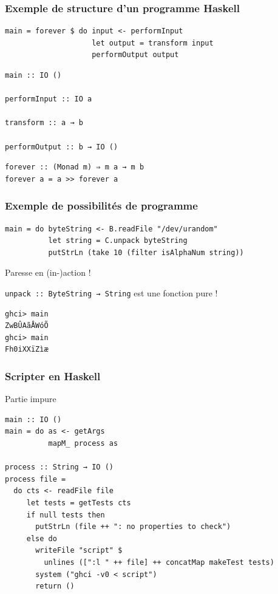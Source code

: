 \documentclass[10pt]{beamer}
\begin{document}
\begin{frame}[fragile]
\frametitle{Exemple de structure d'un programme Haskell}
\begin{verbatim}
main = forever $ do input <- performInput
                    let output = transform input
                    performOutput output
\end{verbatim}

\begin{verbatim}
main :: IO ()

performInput :: IO a

transform :: a → b

performOutput :: b → IO ()
\end{verbatim}

\pause

\begin{verbatim}
forever :: (Monad m) ⇒ m a → m b
forever a = a >> forever a
\end{verbatim}

\end{frame}



\begin{frame}[fragile]
\frametitle{Exemple de possibilités de programme}
\begin{verbatim}
main = do byteString <- B.readFile "/dev/urandom"
          let string = C.unpack byteString
          putStrLn (take 10 (filter isAlphaNum string))
\end{verbatim}

Paresse en (in-)action !

\verb|unpack :: ByteString → String| est une fonction pure !

\begin{verbatim}
ghci> main
ZwBÛAãÅWóÕ
ghci> main
Fh0iXXïZìæ
\end{verbatim}
\end{frame}



\begin{frame}[fragile]
\frametitle{Scripter en Haskell}
\begin{block}{Partie impure}
\begin{verbatim}
main :: IO ()
main = do as <- getArgs
          mapM_ process as

process :: String → IO ()
process file =
  do cts <- readFile file
     let tests = getTests cts
     if null tests then
       putStrLn (file ++ ": no properties to check")
     else do
       writeFile "script" $
         unlines ([":l " ++ file] ++ concatMap makeTest tests)
       system ("ghci -v0 < script")
       return ()
\end{verbatim}
\end{block}
\end{frame}
\end{document}
